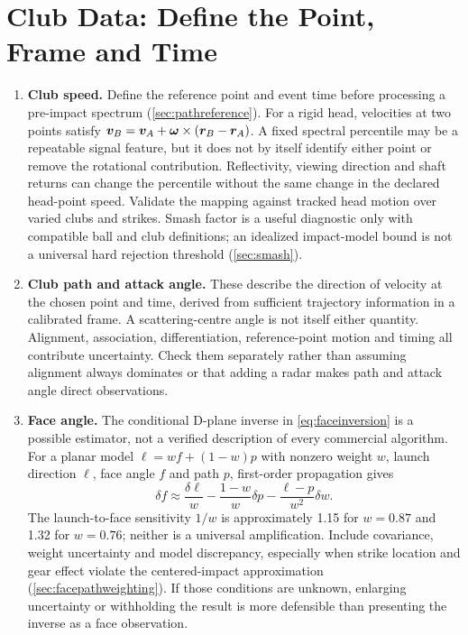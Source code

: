 \section{Club Data: Define the Point, Frame and Time}

\begin{enumerate}
\item \textbf{Club speed.}
Define the reference point and event time before processing a pre-impact spectrum (\cref{sec:pathreference}).
For a rigid head, velocities at two points satisfy $\bm{v}_B=\bm{v}_A+\bm{\omega}\times(\bm{r}_B-\bm{r}_A)$.
A fixed spectral percentile may be a repeatable signal feature, but it does not by itself identify either point or remove the rotational contribution.
Reflectivity, viewing direction and shaft returns can change the percentile without the same change in the declared head-point speed.
Validate the mapping against tracked head motion over varied clubs and strikes.
Smash factor is a useful diagnostic only with compatible ball and club definitions; an idealized impact-model bound is not a universal hard rejection threshold (\cref{sec:smash}).
\item \textbf{Club path and attack angle.}
These describe the direction of velocity at the chosen point and time, derived from sufficient trajectory information in a calibrated frame.
A scattering-centre angle is not itself either quantity.
Alignment, association, differentiation, reference-point motion and timing all contribute uncertainty.
Check them separately rather than assuming alignment always dominates or that adding a radar makes path and attack angle direct observations.
\item \textbf{Face angle.}
The conditional D-plane inverse in \cref{eq:faceinversion} is a possible estimator, not a verified description of every commercial algorithm.
For a planar model $\ell=wf+(1-w)p$ with nonzero weight $w$, launch direction $\ell$, face angle $f$ and path $p$, first-order propagation gives
\begin{equation}
\label{eq:designfaceuncertainty}
\delta f\approx\frac{\delta\ell}{w}
-\frac{1-w}{w}\delta p
-\frac{\ell-p}{w^2}\delta w.
\end{equation}
The launch-to-face sensitivity $1/w$ is approximately 1.15 for $w=0.87$ and 1.32 for $w=0.76$; neither is a universal amplification.
Include covariance, weight uncertainty and model discrepancy, especially when strike location and gear effect violate the centered-impact approximation (\cref{sec:facepathweighting}).
If those conditions are unknown, enlarging uncertainty or withholding the result is more defensible than presenting the inverse as a face observation.

\end{enumerate}
